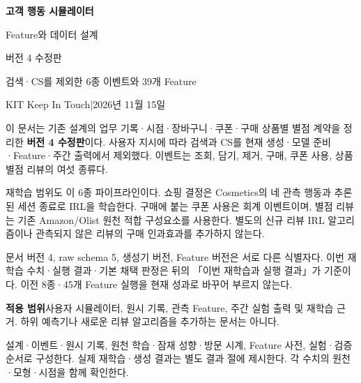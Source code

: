 \documentclass[11pt,a4paper]{article}
\newcommand{\note}[1]{\par\noindent\colorbox{pale}{\parbox{\dimexpr\linewidth-2\fboxsep}{\small #1}}\par}
\newcommand{\page}{\clearpage}
\begin{document}
\thispagestyle{fancy}
{\Huge\bfseries\color{ink}고객 행동 시뮬레이터\par}
\vspace{5pt}
{\LARGE\color{ink}Feature와 데이터 설계\par}
\vspace{10pt}
{\Large 버전 4 수정판\par}
{\large 검색·CS를 제외한 6종 이벤트와 39개 Feature\par}
\vspace{9pt}
{\small KIT Keep In Touch\quad |\quad 2026년 11월 15일}

이 문서는 기존 설계의 업무 기록·시점·장바구니·쿠폰·구매 상품별 별점 계약을 정리한 \textbf{버전 4 수정판}이다. 사용자 지시에 따라 검색과 CS를 현재 생성·모델 준비·Feature·주간 출력에서 제외했다. 이벤트는 조회, 담기, 제거, 구매, 쿠폰 사용, 상품 별점 리뷰의 여섯 종류다.

재학습 범위도 이 6종 파이프라인이다. 쇼핑 결정은 Cosmetics의 네 관측 행동과 추론된 세션 종료로 IRL을 학습한다. 구매에 붙는 쿠폰 사용은 회계 이벤트이며, 별점 리뷰는 기존 Amazon/Olist 원천 적합 구성요소를 사용한다. 별도의 신규 리뷰 IRL 알고리즘이나 관측되지 않은 리뷰의 구매 인과효과를 추가하지 않는다.

\note{문서 버전 4, raw schema 5, 생성기 버전, Feature 버전은 서로 다른 식별자다. 이번 재학습 수치·실행 결과·기본 채택 판정은 뒤의 「이번 재학습과 실행 결과」가 기준이다. 이전 8종·45개 Feature 실행을 현재 성과로 바꾸어 부르지 않는다.}
\vspace{12pt}
\textbf{적용 범위}\quad 사용자 시뮬레이터, 원시 기록, 관측 Feature, 주간 실험 출력 및 재학습 근거. 하위 예측기나 새로운 리뷰 알고리즘을 추가하는 문서는 아니다.
\page
\renewcommand{\contentsname}{문서 안내}
\tableofcontents
\vspace{10pt}
\note{설계·이벤트·원시 기록, 원천 학습·잠재 성향·방문 시계, Feature 사전, 실험·검증 순서로 구성한다. 실제 재학습·생성 결과는 별도 결과 절에 제시한다. 각 수치의 원천·모형·시점을 함께 확인한다.}

\page
\end{document}
